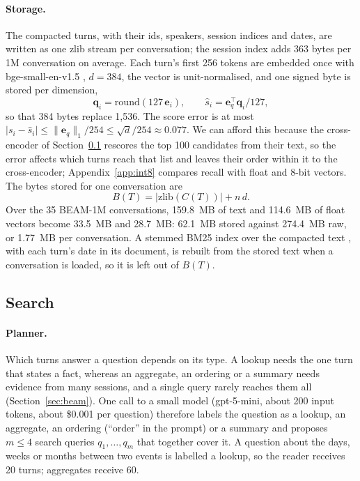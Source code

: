 \paragraph{Storage.} The compacted turns, with their ids, speakers, session indices and dates, are written as one zlib stream per conversation; the session index adds 363 bytes per 1M conversation on average. Each turn's first 256 tokens are embedded once with bge-small-en-v1.5 \citep{xiao2023cpack}, $d = 384$, the vector is unit-normalised, and one signed byte is stored per dimension,
\begin{equation}
\mathbf{q}_i = \mathrm{round}(127\,\mathbf{e}_i), \qquad \hat{s}_i = \mathbf{e}_q^{\top}\mathbf{q}_i / 127 ,
\label{eq:quant}
\end{equation}
so that 384 bytes replace 1,536. The score error is at most $|s_i - \hat{s}_i| \le \|\mathbf{e}_q\|_1 / 254 \le \sqrt{d}/254 \approx 0.077$. We can afford this because the cross-encoder of Section~\ref{sec:search} rescores the top 100 candidates from their text, so the error affects which turns reach that list and leaves their order within it to the cross-encoder; Appendix~\ref{app:int8} compares recall with float and 8-bit vectors. The bytes stored for one conversation are
\begin{equation}
B(T) = |\mathrm{zlib}(C(T))| + n\,d .
\label{eq:bytes}
\end{equation}
Over the 35 BEAM-1M conversations, 159.8~MB of text and 114.6~MB of float vectors become 33.5~MB and 28.7~MB: 62.1~MB stored against 274.4~MB raw, or 1.77~MB per conversation. A stemmed BM25 index over the compacted text \citep{robertson2009bm25}, with each turn's date in its document, is rebuilt from the stored text when a conversation is loaded, so it is left out of $B(T)$.

\subsection{Search}
\label{sec:search}

\paragraph{Planner.} Which turns answer a question depends on its type. A lookup needs the one turn that states a fact, whereas an aggregate, an ordering or a summary needs evidence from many sessions, and a single query rarely reaches them all (Section~\ref{sec:beam}). One call to a small model (gpt-5-mini, about 200 input tokens, about \$0.001 per question) therefore labels the question as a lookup, an aggregate, an ordering (``order'' in the prompt) or a summary and proposes $m \le 4$ search queries $q_1, \dots, q_m$ that together cover it. A question about the days, weeks or months between two events is labelled a lookup, so the reader receives 20 turns; aggregates receive 60.

